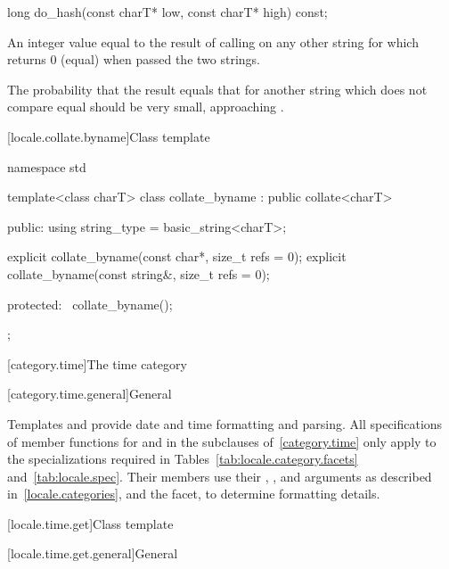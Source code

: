 %
\begin{itemdecl}
long do_hash(const charT* low, const charT* high) const;
\end{itemdecl}

\begin{itemdescr}
\pnum
\returns
An integer value equal to the result of calling 
on any other string for which  returns 0 (equal)
when passed the two strings.

\pnum
\recommended
The probability that the result equals that for another string
which does not compare equal should be very small,
approaching .
\end{itemdescr}

[locale.collate.byname]{Class template }

%
\begin{codeblock}
namespace std {
  template<class charT>
    class collate_byname : public collate<charT> {
    public:
      using string_type = basic_string<charT>;

      explicit collate_byname(const char*, size_t refs = 0);
      explicit collate_byname(const string&, size_t refs = 0);

    protected:
      ~collate_byname();
    };
}
\end{codeblock}

[category.time]{The time category}

[category.time.general]{General}

\pnum
Templates
 and
provide date and time formatting and parsing.
All specifications of member functions for  and 
in the subclauses of~\ref{category.time} only apply to the
specializations required in Tables~\ref{tab:locale.category.facets}
and~\ref{tab:locale.spec}.
Their members use their
, , and  arguments
as described in~\ref{locale.categories},
and the  facet,
to determine formatting details.

[locale.time.get]{Class template }

[locale.time.get.general]{General}

